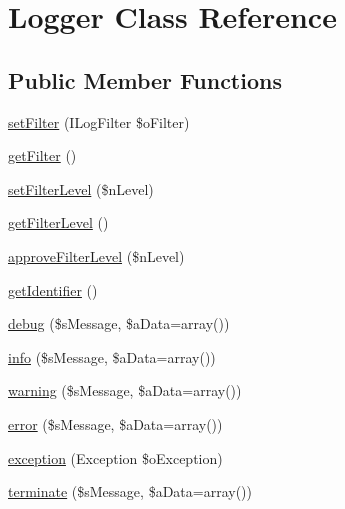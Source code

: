 \hypertarget{class_logger}{\section{Logger Class Reference}
\label{class_logger}
}
\subsection*{Public Member Functions}
\begin{DoxyCompactItemize}
\item 
\hyperlink{class_logger_a54e5e4ead59460c6345d38ed4385e3fc}{set\-Filter} (I\-Log\-Filter \$o\-Filter)
\item 
\hyperlink{class_logger_a71d1988b4a05424766640f00cc0c5ec4}{get\-Filter} ()
\item 
\hyperlink{class_logger_ad960882fc5dd94fe18c9d0417c3985f2}{set\-Filter\-Level} (\$n\-Level)
\item 
\hyperlink{class_logger_aaffe36d440a09bceb9f27f7667fd7625}{get\-Filter\-Level} ()
\item 
\hyperlink{class_logger_abd297d3ef221a659a8d045a32d068959}{approve\-Filter\-Level} (\$n\-Level)
\item 
\hyperlink{class_logger_a4048fbdd126bfa83c8055b56647c226e}{get\-Identifier} ()
\item 
\hyperlink{class_logger_ad978807155d0ef809516b07e6a9c8038}{debug} (\$s\-Message, \$a\-Data=array())
\item 
\hyperlink{class_logger_a7f5530064ae6bc2f1cc65c602e0d817b}{info} (\$s\-Message, \$a\-Data=array())
\item 
\hyperlink{class_logger_ae7113cceb70aca732f04eb561ca46234}{warning} (\$s\-Message, \$a\-Data=array())
\item 
\hyperlink{class_logger_a72684fdf8f0b376067092d448c627b41}{error} (\$s\-Message, \$a\-Data=array())
\item 
\hyperlink{class_logger_a902fc7ccc16f872126f96c5f1c459193}{exception} (Exception \$o\-Exception)
\item 
\hyperlink{class_logger_ad2c4a0987a107ccdfe2676d5c7daa0c6}{terminate} (\$s\-Message, \$a\-Data=array())
\end{DoxyCompactItemize}
